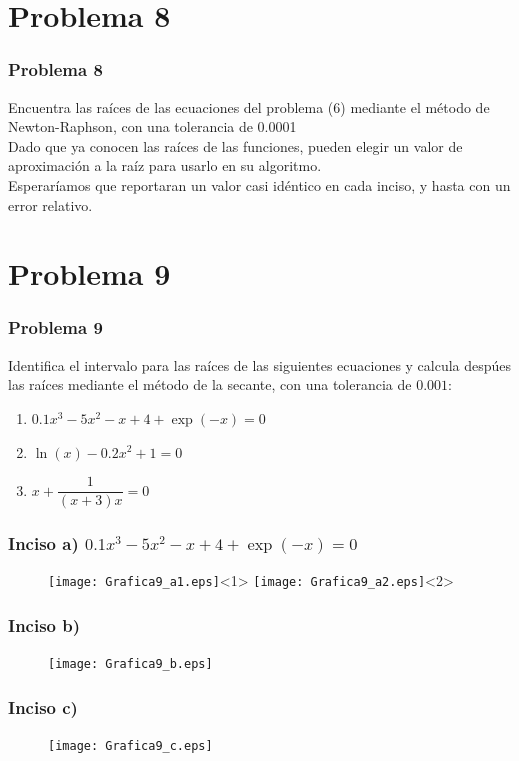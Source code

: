 \section{Problema 8}
\begin{frame}
\frametitle{Problema 8}
Encuentra las ra\'{i}ces de las ecuaciones del problema (6) mediante el m\'{e}todo de Newton-Raphson, con una tolerancia de 0.0001
\\
\bigskip
Dado que ya conocen las ra\'{i}ces de las funciones, pueden elegir un valor de aproximaci\'{o}n a la ra\'{i}z para usarlo en su algoritmo.
\\
\bigskip
Esperar\'{i}amos que reportaran un valor casi id\'{e}ntico en cada inciso, y hasta con un error relativo.
\end{frame}
\section{Problema 9}
\begin{frame}
\frametitle{Problema 9}
Identifica el intervalo para las ra\'{i}ces de las siguientes ecuaciones y calcula desp\'{u}es las ra\'{i}ces mediante el m\'{e}todo de la secante, con una tolerancia de $0.001$:
	\begin{enumerate}
		\item $0.1 x^{3} - 5 x^{2} - x + 4 + \exp(-x) = 0 $
		\item $\ln(x) -0.2 x^{2} + 1 = 0$
		\item $x + \dfrac{1}{(x+3)x}= 0$
	\end{enumerate}
\end{frame}
\begin{frame}
\frametitle{Inciso a) $0.1 x^{3} - 5 x^{2} - x + 4 + \exp(-x) = 0 $}
\begin{figure}
	\centering
	\texttt{[image: Grafica9\_a1.eps]}<1> 
	\texttt{[image: Grafica9\_a2.eps]}<2>
\end{figure}
\end{frame}
\begin{frame}
\frametitle{Inciso b)}
\begin{figure}
	\centering
	\texttt{[image: Grafica9\_b.eps]} 
\end{figure}
\end{frame}
\begin{frame}
\frametitle{Inciso c)}
\begin{figure}
	\centering
	\texttt{[image: Grafica9\_c.eps]} 
\end{figure}
\end{frame}
